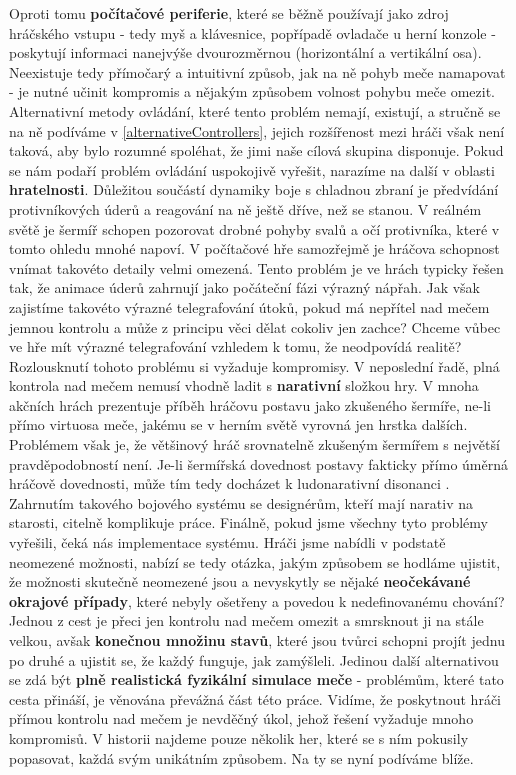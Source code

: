 Oproti tomu \textbf{počítačové periferie}, které se běžně používají jako zdroj hráčského vstupu - tedy myš a klávesnice, popřípadě ovladače u herní konzole - poskytují informaci nanejvýše dvourozměrnou (horizontální a vertikální osa). Neexistuje tedy přímočarý a intuitivní způsob, jak na ně pohyb meče namapovat - je nutné učinit kompromis a nějakým způsobem volnost pohybu meče omezit. Alternativní metody ovládání, které tento problém nemají, existují, a stručně se na ně podíváme v \ref{alternativeControllers}, jejich rozšířenost mezi hráči však není taková, aby bylo rozumné spoléhat, že jimi naše cílová skupina disponuje.
\bigbreak
Pokud se nám podaří problém ovládání uspokojivě vyřešit, narazíme na další v oblasti \textbf{hratelnosti}. Důležitou součástí dynamiky boje s chladnou zbraní je předvídání protivníkových úderů a reagování na ně ještě dříve, než se stanou. V reálném světě je šermíř schopen pozorovat drobné pohyby svalů a očí protivníka, které v tomto ohledu mnohé napoví. V počítačové hře samozřejmě je hráčova schopnost vnímat takovéto detaily velmi omezená. Tento problém je ve hrách typicky řešen tak, že animace úderů zahrnují jako počáteční fázi výrazný nápřah. Jak však zajistíme takovéto výrazné telegrafování útoků, pokud má nepřítel nad mečem jemnou kontrolu a může z principu věci dělat cokoliv jen zachce? Chceme vůbec ve hře mít výrazné telegrafování vzhledem k tomu, že neodpovídá realitě? Rozlousknutí tohoto problému si vyžaduje kompromisy.
\bigbreak
V neposlední řadě, plná kontrola nad mečem nemusí vhodně ladit s \textbf{narativní} složkou hry. V mnoha akčních hrách prezentuje příběh hráčovu postavu jako zkušeného šermíře, ne-li přímo virtuosa meče, jakému se v herním světě vyrovná jen hrstka dalších. Problémem však je, že většinový hráč srovnatelně zkušeným šermířem s největší pravděpodobností není. Je-li šermířská dovednost postavy fakticky přímo úměrná hráčově dovednosti, může tím tedy docházet k ludonarativní disonanci \cite{LudonarrativeDissonance}. Zahrnutím takového bojového systému se designérům, kteří mají narativ na starosti, citelně komplikuje práce. 
\bigbreak
Finálně, pokud jsme všechny tyto problémy vyřešili, čeká nás implementace systému. Hráči jsme nabídli v podstatě neomezené možnosti, nabízí se tedy otázka, jakým způsobem se hodláme ujistit, že možnosti skutečně neomezené jsou a nevyskytly se nějaké \textbf{neočekávané okrajové případy}, které nebyly ošetřeny a povedou k nedefinovanému chování? Jednou z cest je přeci jen kontrolu nad mečem omezit a smrsknout ji na stále velkou, avšak \textbf{konečnou množinu stavů}, které jsou tvůrci schopni projít jednu po druhé a ujistit se, že každý funguje, jak zamýšleli. Jedinou další alternativou se zdá být \textbf{plně realistická fyzikální simulace meče} - problémům, které tato cesta přináší, je věnována převážná část této práce.  
\bigbreak
Vidíme, že poskytnout hráči přímou kontrolu nad mečem je nevděčný úkol, jehož řešení vyžaduje mnoho kompromisů. V historii najdeme pouze několik her, které se s ním pokusily popasovat, každá svým unikátním způsobem. Na ty se nyní podíváme blíže.


